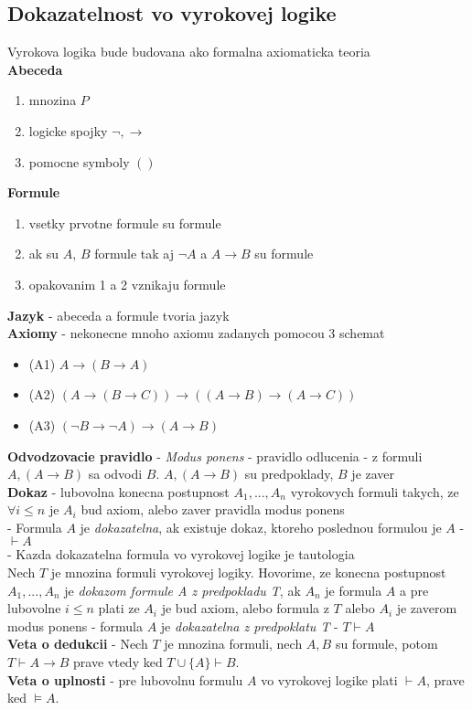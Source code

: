 \documentclass[12pt]{article}
\begin{document}
\subsection{Dokazatelnost vo vyrokovej logike}
Vyrokova logika bude budovana ako formalna axiomaticka teoria \\
\textbf{Abeceda}
\begin{enumerate}
	\item mnozina $P$
	\item logicke spojky $\neg, \to$
	\item pomocne symboly $()$
\end{enumerate}
\textbf{Formule}
\begin{enumerate}
	\item vsetky prvotne formule su formule
	\item ak su $A$, $B$ formule tak aj $\neg A$ a $A \to B$ su formule
	\item opakovanim 1 a 2 vznikaju formule
\end{enumerate}
\textbf{Jazyk} - abeceda a formule tvoria jazyk \\
\textbf{Axiomy} - nekonecne mnoho axiomu zadanych pomocou 3 schemat
\begin{itemize}
	\item (A1) $A \to (B \to A)$
	\item (A2) $(A \to (B \to C)) \to ((A \to B) \to (A \to C))$
	\item (A3) $(\neg B \to \neg A) \to (A \to B)$
\end{itemize}
\textbf{Odvodzovacie pravidlo} - \emph{Modus ponens} - pravidlo odlucenia -
	z formuli $A, (A \to B)$ sa odvodi $B$. $A, (A \to B)$ su predpoklady, $B$ je zaver \\
\textbf{Dokaz} - lubovolna konecna postupnost $A_{1}, ..., A_{n}$ vyrokovych formuli takych,
	ze $\forall i \le n$ je $A_{i}$ bud axiom, alebo zaver pravidla modus ponens \\
- Formula $A$ je \emph{dokazatelna}, ak existuje dokaz, ktoreho poslednou formulou je $A$
- $\vdash A$ \\
- Kazda dokazatelna formula vo vyrokovej logike je tautologia \\
\vspace{0.5cm}
Nech $T$ je mnozina formuli vyrokovej logiky. Hovorime, ze konecna postupnost $A_{1},...,A_{n}$
je \emph{dokazom formule A z predpokladu T}, ak $A_{n}$ je formula $A$ a pre lubovolne
$i \le n$ plati ze $A_{i}$ je bud axiom, alebo formula z $T$ alebo $A_{i}$ je zaverom
modus ponens - formula $A$ je \emph{dokazatelna z predpoklatu T} - $T \vdash A$ \\
\textbf{Veta o dedukcii} - Nech $T$ je mnozina formuli, nech $A,B$ su formule, potom
	$T \vdash A \to B$ prave vtedy ked $T \cup \{A\} \vdash B$. \\
\textbf{Veta o uplnosti} - pre lubovolnu formulu $A$ vo vyrokovej logike plati $\vdash A$,
prave ked $\models A$.
\end{document}
